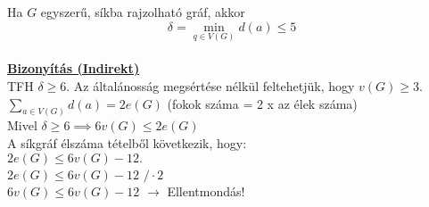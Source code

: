 \documentclass{beamer}
\newcommand{\msmallskip}{\vspace{0.3em}}
\newcommand{\mmedskip}{\vspace{0.5em}}
\newcommand{\mbigskip}{\vspace{1em}}
\begin{document}
\begin{frame}
\begin{tcolorbox}[title={Tétel: Minimális fokszáma síkgráfban.}]
Ha $G$ egyszerű, síkba rajzolható gráf, akkor $$\delta = \min_{{q \in V(G)}} d(a) \leq 5$$\\
\tcblower
\msmallskip
\underline{\textbf{Bizonyítás (Indirekt)}}\\
\mmedskip
TFH $\delta \geq 6$.
Az általánosság megsértése nélkül feltehetjük, hogy $v(G) \geq 3$.\\
$\sum_{{a \in V(G)}} d(a) = 2e(G)$ (fokok száma = 2 x az élek száma)\\
Mivel $\delta \geq 6 \implies 6v(G) \leq 2e(G)$\\
A síkgráf élszáma tételből következik, hogy:\\
$2e(G) \leq 6v(G) - 12.$\\
\mbigskip
$2e(G) \leq 6v(G) - 12$ \hspace{1ex} $/\cdot2$\\
$6v(G) \leq 6v(G) - 12$ $\rightarrow$ Ellentmondás!
\end{tcolorbox}
\end{frame}
\end{document}
